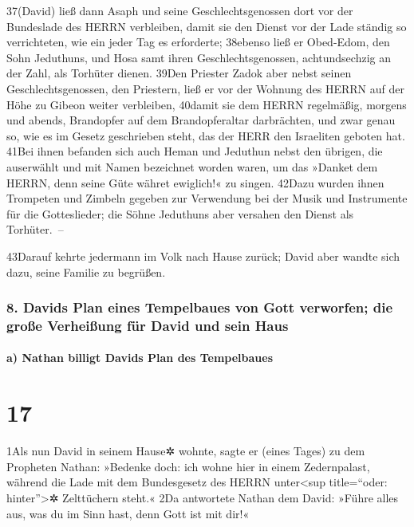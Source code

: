 37(David) ließ dann Asaph und seine Geschlechtsgenossen dort vor der
Bundeslade des HERRN verbleiben, damit sie den Dienst vor der Lade
ständig so verrichteten, wie ein jeder Tag es erforderte; 38ebenso ließ
er Obed-Edom, den Sohn Jeduthuns, und Hosa samt ihren
Geschlechtsgenossen, achtundsechzig an der Zahl, als Torhüter dienen.
39Den Priester Zadok aber nebst seinen Geschlechtsgenossen, den
Priestern, ließ er vor der Wohnung des HERRN auf der Höhe zu Gibeon
weiter verbleiben, 40damit sie dem HERRN regelmäßig, morgens und abends,
Brandopfer auf dem Brandopferaltar darbrächten, und zwar genau so, wie
es im Gesetz geschrieben steht, das der HERR den Israeliten geboten hat.
41Bei ihnen befanden sich auch Heman und Jeduthun nebst den übrigen, die
auserwählt und mit Namen bezeichnet worden waren, um das »Danket dem
HERRN, denn seine Güte währet ewiglich!« zu singen. 42Dazu wurden ihnen
Trompeten und Zimbeln gegeben zur Verwendung bei der Musik und
Instrumente für die Gotteslieder; die Söhne Jeduthuns aber versahen den
Dienst als Torhüter.~--

43Darauf kehrte jedermann im Volk nach Hause zurück; David aber wandte
sich dazu, seine Familie zu begrüßen.

\hypertarget{davids-plan-eines-tempelbaues-von-gott-verworfen-die-grouxdfe-verheiuxdfung-fuxfcr-david-und-sein-haus}{%
\subsubsection{8. Davids Plan eines Tempelbaues von Gott verworfen; die
große Verheißung für David und sein
Haus}\label{davids-plan-eines-tempelbaues-von-gott-verworfen-die-grouxdfe-verheiuxdfung-fuxfcr-david-und-sein-haus}}

\hypertarget{a-nathan-billigt-davids-plan-des-tempelbaues}{%
\paragraph{a) Nathan billigt Davids Plan des
Tempelbaues}\label{a-nathan-billigt-davids-plan-des-tempelbaues}}

\hypertarget{section-16}{%
\section{17}\label{section-16}}

1Als nun David in seinem Hause✲ wohnte, sagte er (eines Tages) zu dem
Propheten Nathan: »Bedenke doch: ich wohne hier in einem Zedernpalast,
während die Lade mit dem Bundesgesetz des HERRN unter\textless sup
title=``oder: hinter''\textgreater✲ Zelttüchern steht.« 2Da antwortete
Nathan dem David: »Führe alles aus, was du im Sinn hast, denn Gott ist
mit dir!«

